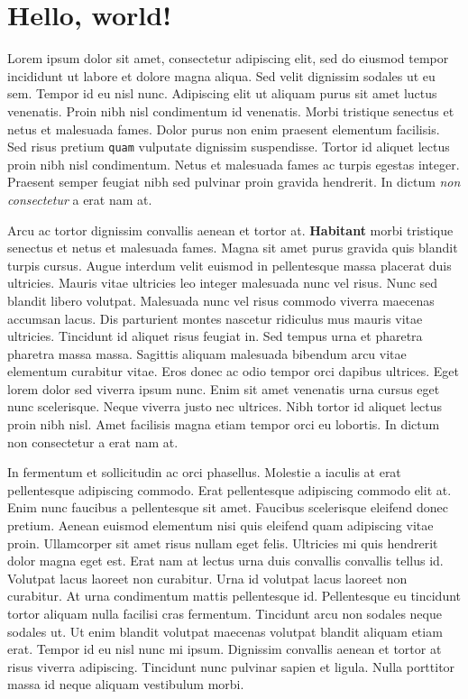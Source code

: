 \documentclass{article}
\begin{document}
\section*{Hello, world!}

Lorem ipsum dolor sit amet, consectetur adipiscing elit, sed do eiusmod tempor
incididunt ut labore et dolore magna aliqua. Sed velit dignissim sodales ut eu
sem. Tempor id eu nisl nunc. Adipiscing elit ut aliquam purus sit amet luctus
venenatis. Proin nibh nisl condimentum id venenatis. Morbi tristique senectus
et netus et malesuada fames. Dolor purus non enim praesent elementum facilisis.
Sed risus pretium {\tt quam} vulputate dignissim suspendisse. Tortor id aliquet
lectus proin nibh nisl condimentum. Netus et malesuada fames ac turpis egestas
integer. Praesent semper feugiat nibh sed pulvinar proin gravida hendrerit. In
dictum \textit{non consectetur} a erat nam at.

Arcu ac tortor dignissim convallis aenean et tortor at. \textbf{Habitant} morbi
tristique senectus et netus et malesuada fames. Magna sit amet purus gravida
quis blandit turpis cursus. Augue interdum velit euismod in pellentesque massa
placerat duis ultricies. Mauris vitae ultricies leo integer malesuada nunc vel
risus. Nunc sed blandit libero volutpat. Malesuada nunc vel risus commodo
viverra maecenas accumsan lacus. Dis parturient montes nascetur ridiculus mus
mauris vitae ultricies. Tincidunt id aliquet risus feugiat in. Sed tempus urna
et pharetra pharetra massa massa. Sagittis aliquam malesuada bibendum arcu
vitae elementum curabitur vitae. Eros donec ac odio tempor orci dapibus
ultrices. Eget lorem dolor sed viverra ipsum nunc. Enim sit amet venenatis urna
cursus eget nunc scelerisque. Neque viverra justo nec ultrices. Nibh tortor id
aliquet lectus proin nibh nisl. Amet facilisis magna etiam tempor orci eu
lobortis. In dictum non consectetur a erat nam at.

\vspace{20mm}

In fermentum et sollicitudin ac orci phasellus. Molestie a iaculis at erat
pellentesque adipiscing commodo. Erat pellentesque adipiscing commodo elit at.
Enim nunc faucibus a pellentesque sit amet. Faucibus scelerisque eleifend donec
pretium. Aenean euismod elementum nisi quis eleifend quam adipiscing vitae
proin. Ullamcorper sit amet risus nullam eget felis. Ultricies mi quis
hendrerit dolor magna eget est. Erat nam at lectus urna duis convallis
convallis tellus id. Volutpat lacus laoreet non curabitur. Urna id volutpat
lacus laoreet non curabitur. At urna condimentum mattis pellentesque id.
Pellentesque eu tincidunt tortor aliquam nulla facilisi cras fermentum.
Tincidunt arcu non sodales neque sodales ut. Ut enim blandit volutpat maecenas
volutpat blandit aliquam etiam erat. Tempor id eu nisl nunc mi ipsum. Dignissim
convallis aenean et tortor at risus viverra adipiscing. Tincidunt nunc pulvinar
sapien et ligula. Nulla porttitor massa id neque aliquam vestibulum morbi.
\end{document}
